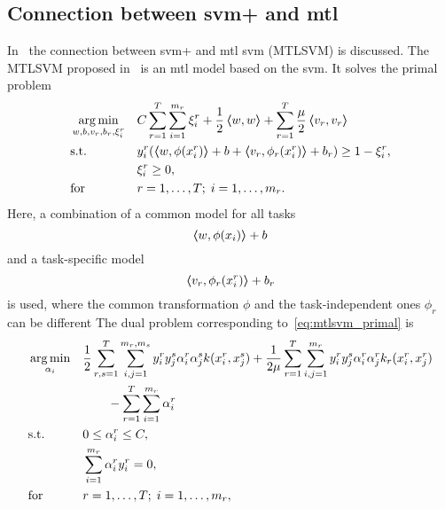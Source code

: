 \subsection{Connection between \acrshort{svm}+ and \acrshort{mtl}}
In~\cite{LiangC08} the connection between \acrshort{svm}+ and \acrshort{mtl} \acrshort{svm} (MTLSVM) is discussed. 
The MTLSVM proposed in~\cite{LiangC08} is an \acrshort{mtl} model based on the \acrshort{svm}. It solves the primal problem
\begin{equation}
    \label{eq:mtlsvm_primal}
    \begin{aligned}
        & \argmin_{w, b, v_r, b_r, \xi_i^r}
        & & C \sum_{r=1}^\ntasks \sum_{i=1}^{\npertask_r} \xi_i^r + \frac{1}{2} \dotp{w}{w} + \sum_{r=1}^\ntasks \frac{\mu}{2} \dotp{v_r}{v_r} \\
        & \text{s.t.}
        & & y_{i}^r ( \dotp{w}{\phi(x_{i}^r)} + b + \dotp{v_r}{\phi_r(x_{i}^r)} + b_r) \geq 1 - \xi_i^r ,\\
        & & &\xi_i^r \geq 0, \\
        & \text{for } & & r=1, \ldots, \ntasks; \; i=1, \ldots, \npertask_r.
    \end{aligned}
\end{equation}
Here, a combination of a common model for all tasks
$$ \bm{\left\langle} w, \phi(x_{i}) \bm{\right\rangle} + b $$
and a task-specific model
$$ \bm{\left\langle} v_r, \phi_r(x_{i}^r) \bm{\right\rangle} + b_r $$
is used, where the common transformation $\phi$ and the task-independent ones $\phi_r$ can be different 
The dual problem corresponding to~\eqref{eq:mtlsvm_primal} is
\begin{equation}\label{eq:mtlsvm_dual}
    \begin{aligned}
        & \argmin_{\alpha_i} 
        & & \frac{1}{2} \sum_{r, s=1}^\ntasks \sum_{i, j=1}^{\npertask_r, \npertask_s} y_i^r y_j^s \alpha_i^r \alpha_j^s k(x_i^r, x_j^s) + \frac{1}{2 \mu} \sum_{r=1}^\ntasks  \sum_{i, j=1}^{\npertask_r} y_i^r y_j^s \alpha_i^r \alpha_j^r k_r(x^r_i, x^r_j) \\
        & & & \qquad - \sum_{r=1}^\ntasks \sum_{i=1}^{\npertask_r} \alpha_i^r \\
        & \text{s.t.}
        & & 0 \leq \alpha_i^r \leq C ,\\
        & & & \sum_{i=1}^{\npertask_r}{\alpha_i^r y_i^r} = 0, \\
        & \text{for } & & r=1, \ldots, \ntasks; \; i=1, \ldots, \npertask_r ,
        \end{aligned}
\end{equation}
